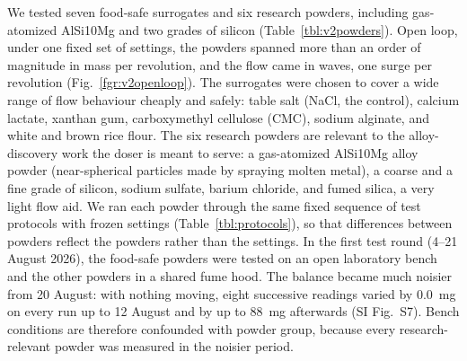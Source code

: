 \documentclass[twoside,twocolumn,9pt]{article}
\begin{document}
We tested seven food-safe surrogates and six research powders, including gas-atomized AlSi10Mg and two grades of silicon (Table~\ref{tbl:v2powders}). Open loop, under one fixed set of settings, the powders spanned more than an order of magnitude in mass per revolution, and the flow came in waves, one surge per revolution (Fig.~\ref{fgr:v2openloop}). The surrogates were chosen to cover a wide range of flow behaviour cheaply and safely: table salt (NaCl, the control), calcium lactate, xanthan gum, carboxymethyl cellulose (CMC), sodium alginate, and white and brown rice flour. The six research powders are relevant to the alloy-discovery work the doser is meant to serve: a gas-atomized AlSi10Mg alloy powder (near-spherical particles made by spraying molten metal), a coarse and a fine grade of silicon, sodium sulfate, barium chloride, and fumed silica, a very light flow aid. We ran each powder through the same fixed sequence of test protocols with frozen settings (Table~\ref{tbl:protocols}), so that differences between powders reflect the powders rather than the settings. In the first test round (4--21 August 2026), the food-safe powders were tested on an open laboratory bench and the other powders in a shared fume hood. The balance became much noisier from 20 August: with nothing moving, eight successive readings varied by 0.0~mg on every run up to 12 August and by up to 88~mg afterwards (SI Fig.~S7). Bench conditions are therefore confounded with powder group, because every research-relevant powder was measured in the noisier period.
\end{document}
